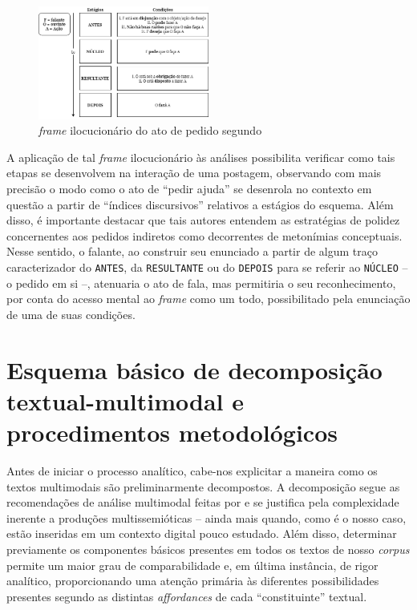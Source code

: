 \documentclass{textolivre}
\begin{document}
\begin{figure}[htbp]
 \centering
 \includegraphics[width=0.5\textwidth]{fig01}
 \caption{\textit{frame} ilocucionário do ato de pedido segundo \textcite{panther2017}\protect\footnotemark}
 \label{fig01}
\end{figure}

A aplicação de tal \textit{frame} ilocucionário às análises possibilita verificar como tais etapas se desenvolvem na interação de uma postagem, observando com mais precisão o modo como o ato de “pedir ajuda” se desenrola no contexto em questão a partir de “índices discursivos” relativos a estágios do esquema. Além disso, é importante destacar que tais autores entendem as estratégias de polidez concernentes aos pedidos indiretos como decorrentes de metonímias conceptuais. Nesse sentido, o falante, ao construir seu enunciado a partir de algum traço caracterizador do \texttt{ANTES}, da \texttt{RESULTANTE} ou do \texttt{DEPOIS} para se referir ao \texttt{NÚCLEO} -- o pedido em si --, atenuaria o ato de fala, mas permitiria o seu reconhecimento, por conta do acesso mental ao \textit{frame} como um todo, possibilitado pela enunciação de uma de suas condições.

\section{Esquema básico de decomposição textual-multimodal e procedimentos metodológicos}\label{sec-esquema}

Antes de iniciar o processo analítico, cabe-nos explicitar a maneira como os textos multimodais são preliminarmente decompostos. A decomposição segue as recomendações de análise multimodal feitas por \textcite{bateman2017} e se justifica pela complexidade inerente a produções multissemióticas – ainda mais quando, como é o nosso caso, estão inseridas em um contexto digital pouco estudado. Além disso, determinar previamente os componentes básicos presentes em todos os textos de nosso \textit{corpus} permite um maior grau de comparabilidade e, em última instância, de rigor analítico, proporcionando uma atenção primária às diferentes possibilidades presentes segundo as distintas \textit{affordances} de cada “constituinte” textual.
\end{document}
